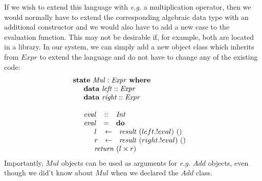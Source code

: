 If we wish to extend this language with \emph{e.g.} a multiplication operator, then we would normally have to extend the corresponding algebraic data type with an additional constructor and we would also have to add a new case to the evaluation function. This may not be desirable if, for example, both are located in a library. In our system, we can simply add a new object class which inherits from $\mathit{Expr}$ to extend the language and do not have to change any of the existing code:
\begin{displaymath}
\begin{array}{l}
\mathbf{state}~\mathit{Mul} : \mathit{Expr}~\mathbf{where} \\
\quad \begin{array}{lcl}
\multicolumn{3}{l}{\mathbf{data}~\mathit{left}  :: \mathit{Expr}} \\
\multicolumn{3}{l}{\mathbf{data}~\mathit{right}  :: \mathit{Expr}} \\\\
\mathit{eval} & :: & \mathit{Int} \\
\mathit{eval} & = & \mathbf{do} \\
\multicolumn{3}{l}{\quad \begin{array}{lcl}
    l & \leftarrow & \mathit{result}~(left.!eval)~() \\
    r & \leftarrow & \mathit{result}~(right.!eval)~() \\
    \multicolumn{3}{l}{\mathit{return}~(l \times r)}
    \end{array}} 
\end{array}
\end{array}
\end{displaymath}
Importantly, $\mathit{Mul}$ objects can be used as arguments for \emph{e.g.} $\mathit{Add}$ objects, even though we did't know about $\mathit{Mul}$ when we declared the $\mathit{Add}$ class.
